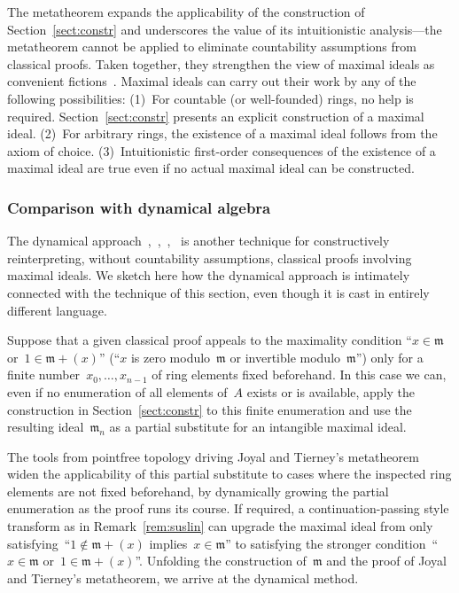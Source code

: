 \documentclass[envcountsect,envcountsame,runningheads]{llncs}
\newcommand{\mmm}{\mathfrak{m}}
\renewcommand{\_}{\mathpunct{.}\,}
\begin{document}
The metatheorem expands the applicability of the construction of
Section~\ref{sect:constr} and underscores the value of its intuitionistic
analysis---the metatheorem cannot be applied to eliminate countability assumptions from classical proofs.
Taken together, they strengthen the
view of maximal ideals as convenient fictions~\cite[Section~1]{schuster-wessel:krull}. Maximal ideals can
carry out their work by any of the following possibilities:
(1)~For countable (or well-founded) rings, no help is required.
Section~\ref{sect:constr} presents an explicit construction of a maximal ideal.
(2)~For arbitrary rings, the existence of a maximal ideal follows from the
axiom of choice.
(3)~Intuitionistic first-order consequences of the existence of a maximal
ideal are true even if no actual maximal ideal can be constructed.


\subsubsection{Comparison with dynamical algebra}

The dynamical approach~\cite[Section~XV.6]{lombardi-quitte:constructive-algebra},~\cite{coquand-lombardi-roy:dynamicalmethod},~\cite{yengui:constructive},~\cite{duval:about}
is another technique for constructively reinterpreting,
without countability assumptions, classical proofs involving maximal ideals.
We sketch here how the dynamical approach is intimately connected with the
technique of this section, even though it is cast in entirely different
language.

Suppose that a given classical proof appeals to the maximality condition ``$x \in \mmm$
or~$1 \in \mmm + (x)$'' (``$x$ is zero modulo~$\mmm$ or invertible
modulo~$\mmm$'') only for a finite number~$x_0,\ldots,x_{n-1}$ of ring elements
fixed beforehand. In this case we can, even if no enumeration of all elements
of~$A$ exists or is available, apply the construction in Section~\ref{sect:constr} to
this finite enumeration and use the resulting ideal~$\mmm_n$ as a partial
substitute for an intangible maximal ideal.

The tools from pointfree topology
driving Joyal and Tierney's metatheorem widen the applicability of this partial
substitute to cases where the inspected ring elements are
not fixed beforehand, by dynamically growing the partial enumeration as the
proof runs its course. If required, a continuation-passing style transform as
in Remark~\ref{rem:suslin} can upgrade the maximal ideal from only
satisfying~``$1 \not\in \mmm + (x)$ implies~$x \in
\mmm$'' to satisfying the stronger condition~``$x \in \mmm$ or~$1 \in \mmm
+ (x)$''.
%
Unfolding the construction of~$\mmm$ and the proof of Joyal
and Tierney's metatheorem, we arrive at the dynamical method.
\end{document}
